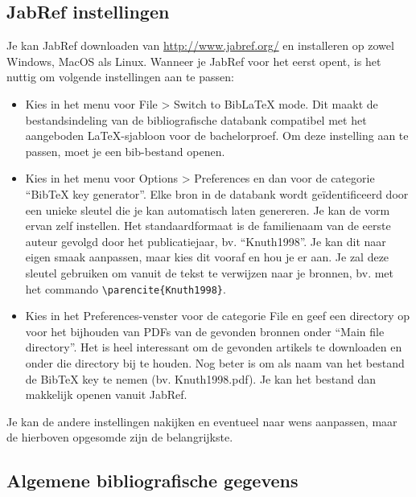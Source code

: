 \subsection{JabRef instellingen}
\label{sub:jabref_instellingen}

Je kan JabRef downloaden van \url{http://www.jabref.org/} en installeren op zowel Windows, MacOS als Linux. Wanneer je JabRef voor het eerst opent, is het nuttig om volgende instellingen aan te passen:

\begin{itemize}
  \item Kies in het menu voor File > Switch to BibLaTeX mode. Dit maakt de bestandsindeling van de bibliografische databank compatibel met het aangeboden {\LaTeX}-sjabloon voor de bachelorproef. Om deze instelling aan te passen, moet je een bib-bestand openen.
  \item Kies in het menu voor Options > Preferences en dan voor de categorie ``BibTeX key generator''. Elke bron in de databank wordt geïdentificeerd door een unieke sleutel die je kan automatisch laten genereren. Je kan de vorm ervan zelf instellen. Het standaardformaat is de familienaam van de eerste auteur gevolgd door het publicatiejaar, bv. ``Knuth1998''. Je kan dit naar eigen smaak aanpassen, maar kies dit vooraf en hou je er aan. Je zal deze sleutel gebruiken om vanuit de tekst te verwijzen naar je bronnen, bv. met het commando \verb|\parencite{Knuth1998}|.
  \item Kies in het Preferences-venster voor de categorie File en geef een directory op voor het bijhouden van PDFs van de gevonden bronnen onder ``Main file directory''. Het is heel interessant om de gevonden artikels te downloaden en onder die directory bij te houden. Nog beter is om als naam van het bestand de BibTeX key te nemen (bv. Knuth1998.pdf). Je kan het bestand dan makkelijk openen vanuit JabRef.
\end{itemize}

Je kan de andere instellingen nakijken en eventueel naar wens aanpassen, maar de hierboven opgesomde zijn de belangrijkste.

\subsection{Algemene bibliografische gegevens}
\label{sub:algemene_bibliografische_gegevens}

